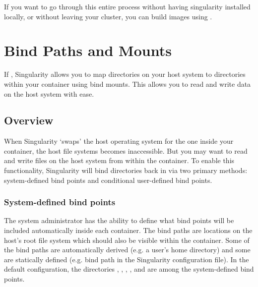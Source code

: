 \documentclass[letterpaper,10pt,english]{sphinxmanual}
\begin{document}
If you want to go through this entire process without having
singularity installed locally, or without leaving your cluster, you
can build images using .


\chapter{Bind Paths and Mounts}
\label{\detokenize{bind_paths_and_mounts:bind-paths-and-mounts}}\label{\detokenize{bind_paths_and_mounts:id1}}\label{\detokenize{bind_paths_and_mounts::doc}}\label{\detokenize{bind_paths_and_mounts:sec-bindpaths}}
If , Singularity allows you to map
directories on your host system to directories within your container
using bind mounts. This allows you to read and write data on the host
system with ease.


\section{Overview}
\label{\detokenize{bind_paths_and_mounts:overview}}
When Singularity ‘swaps’ the host operating system for the one inside
your container, the host file systems becomes inaccessible. But you may
want to read and write files on the host system from within the
container. To enable this functionality, Singularity will bind
directories back in via two primary methods: system-defined bind points
and conditional user-defined bind points.


\subsection{System-defined bind points}
\label{\detokenize{bind_paths_and_mounts:system-defined-bind-points}}
The system administrator has the ability to define what bind points will
be included automatically inside each container. The bind paths are
locations on the host’s root file system which should also be visible
within the container. Some of the bind paths are automatically derived
(e.g. a user’s home directory) and some are statically defined (e.g.
bind path in the Singularity configuration file). In the default
configuration, the directories  ,  ,  ,  ,  and are among the system-defined
bind points.
\end{document}
